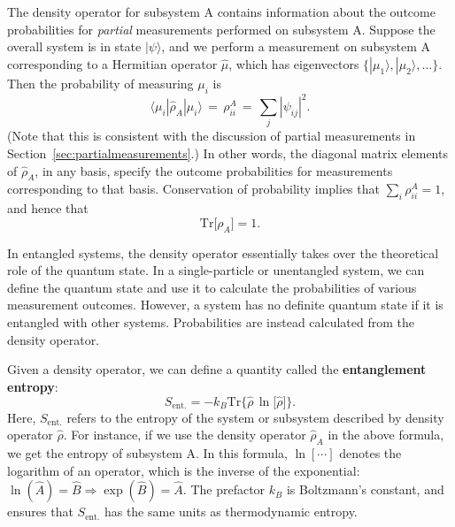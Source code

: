 \documentclass[pra,12pt]{revtex4}
\begin{document}
The density operator for subsystem A contains information about the
outcome probabilities for \textit{partial} measurements performed on
subsystem A.  Suppose the overall system is in state $|\psi\rangle$,
and we perform a measurement on subsystem A corresponding to a
Hermitian operator $\hat{\mu}$, which has eigenvectors
$\{|\mu_1\rangle,|\mu_2\rangle,\dots\}$.  Then the probability of
measuring $\mu_i$ is
\begin{equation}
  \langle \mu_i | \hat{\rho}_A |\mu_i \rangle \,=\, \rho_{ii}^A \,=\, \sum_{j} |\psi_{ij}|^2.
\end{equation}
(Note that this is consistent with the discussion of partial
measurements in Section~\ref{sec:partialmeasurements}.)  In other
words, the diagonal matrix elements of $\hat{\rho}_A$, in any basis,
specify the outcome probabilities for measurements corresponding to
that basis.  Conservation of probability implies that $\sum_i
\rho^A_{ii} = 1$, and hence that
\begin{equation}
  \mathrm{Tr}\big[\rho_A\big] = 1.
\end{equation}

In entangled systems, the density operator essentially takes over the
theoretical role of the quantum state.  In a single-particle or
unentangled system, we can define the quantum state and use it to
calculate the probabilities of various measurement outcomes.  However,
a system has no definite quantum state if it is entangled with other
systems.  Probabilities are instead calculated from the density
operator.

Given a density operator, we can define a quantity called the
\textbf{entanglement entropy}:
\begin{equation}
  S_{\mathrm{ent.}} = - k_B \mathrm{Tr} \Big\{ \hat{\rho}\, \ln\!\big[\hat{\rho}\big]\Big\}.
\end{equation}
Here, $S_{\mathrm{ent.}}$ refers to the entropy of the system or
subsystem described by density operator $\hat{\rho}$.  For instance,
if we use the density operator $\hat{\rho}_A$ in the above formula, we
get the entropy of subsystem A.  In this formula, $\ln[\cdots]$
denotes the logarithm of an operator, which is the inverse of the
exponential: $\ln(\hat{A}) = \hat{B} \Rightarrow \exp(\hat{B}) =
\hat{A}$.  The prefactor $k_B$ is Boltzmann's constant, and ensures
that $S_{\mathrm{ent.}}$ has the same units as thermodynamic entropy.
\end{document}
